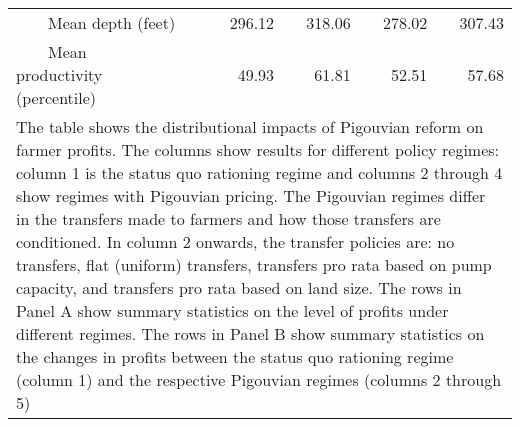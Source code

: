 \begin{table}[!ht]
\begin{tabular}{lrrrrr}
		~~~~Mean depth (feet)&  &296.12&318.06&278.02&307.43\\
		~~~~Mean productivity (percentile)&  &49.93&61.81&52.51&57.68\\
		\bottomrule
\multicolumn{6}{p{0.80\hsize}}{\footnotesize The table shows the distributional impacts of Pigouvian reform on farmer profits. The columns show results for different policy regimes: column 1 is the status quo rationing regime and columns 2 through 4 show regimes with Pigouvian pricing. The Pigouvian regimes differ in the transfers made to farmers and how those transfers are conditioned. In column 2 onwards, the transfer policies are: no transfers, flat (uniform) transfers, transfers pro rata based on pump capacity, and transfers pro rata based on land size. The rows in Panel A show summary statistics on the level of profits under different regimes. The rows in Panel B show summary statistics on the changes in profits between the status quo rationing regime (column 1) and the respective Pigouvian regimes (columns 2 through 5)} \\
	\end{tabular}
\end{table}
